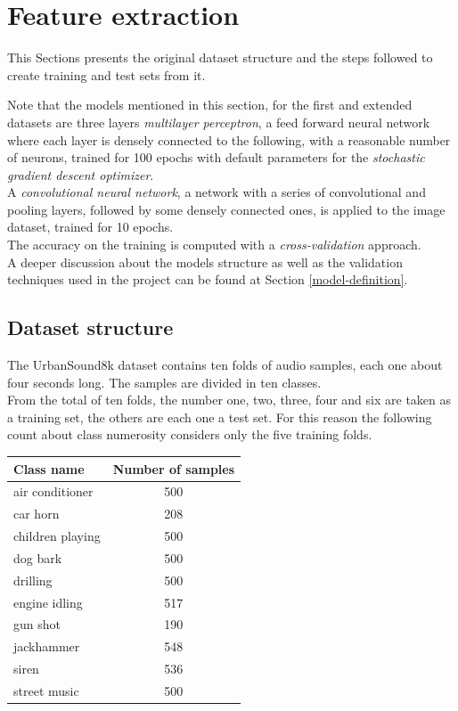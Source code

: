 \section{Feature extraction}
\label{feature-extraction}

This Sections presents the original dataset structure and the 
steps followed to create training and test sets from it.

Note that the models mentioned in this section, for the first and 
extended datasets are
three layers \emph{multilayer perceptron}, 
a feed forward neural network where each layer 
is densely connected  to the following, 
with a reasonable number of neurons, trained 
for 100 epochs with default parameters for the \emph{stochastic gradient 
descent optimizer}.~\cite{mlp}\cite{sgd}\\

A \emph{convolutional neural network}, a network with 
a series of convolutional and pooling layers, followed by 
some densely connected ones, is applied to the image dataset, trained for 10 epochs.~\cite{cnn} \\
The accuracy on the training is computed with a \emph{cross-validation} 
approach.~\cite{cross}\\

A deeper discussion about the models structure as well as the validation
techniques used in the project can be found at Section \vref{model-definition}.

\subsection{Dataset structure}
\label{dataset-structure}

The UrbanSound8k dataset contains ten folds of audio samples, each one about 
four seconds long. The samples are divided in ten classes.\\
From the total of ten folds, the number one, two, three, four and six 
are taken as a training set, the others are each one a test set.
For this reason the following count about class numerosity considers
only the five training folds.

\begin{center}
    \begin{tabular}{ |l|c| } 
        \hline
        Class name & Number of samples \\
        \hline
        air conditioner & 500 \\
        car horn & 208 \\
        children playing & 500 \\
        dog bark & 500 \\
        drilling & 500 \\
        engine idling & 517 \\
        gun shot & 190 \\
        jackhammer & 548 \\
        siren & 536 \\
        street music & 500 \\
        \hline
    \end{tabular}
\end{center}

